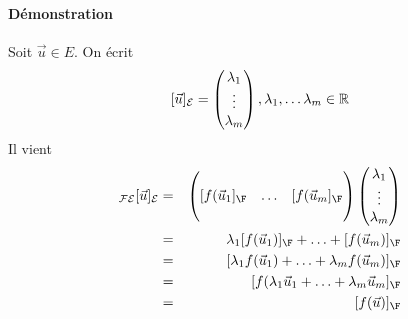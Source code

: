 \paragraph{Démonstration} Soit $\vec{u} \in E$. On écrit
$$[\vec{u}]_{\mathcal{E}} = \begin{pmatrix} \lambda_1 \\ \vdots \\ \lambda_m \end{pmatrix}, \lambda_1, \ldots \lambda_m \in \mathbb{R}$$
Il vient
\begin{eqnarray*}
  [f]_{\cF \cE}[\vec{u}]_{\cE}
  &=& 
  \begin{pmatrix} \\ [f(\vec{u}_1]_\F & \ldots & [f(\vec{u}_m]_\F \\ \\ \end{pmatrix}
  \begin{pmatrix} \lambda_1 \\ \vdots \\ \lambda_m \end{pmatrix} \\
  &=& \lambda_1 [f(\vec{u}_1)]_\F + \ldots + [f(\vec{u}_m)]_\F \\
  &=& [\lambda_1 f(\vec{u}_1) + \ldots + \lambda_m f(\vec{u}_m)]_\F \\
  &=& [ f( \lambda_1 \vec{u}_1 + \ldots + \lambda_m \vec{u}_m]_\F \\
  &=& [f(\vec{u})]_\F
\end{eqnarray*}

